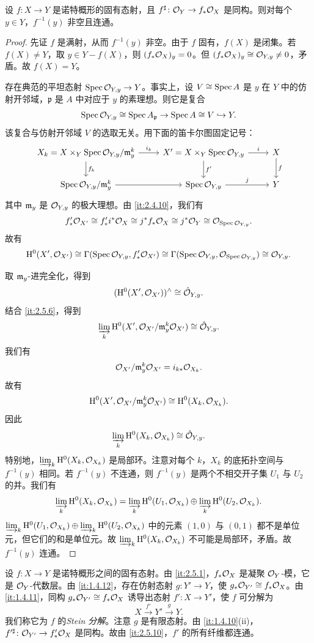 \begin{theorem}[连通性定理]\label{it:2.5.10}
设 $f\colon X\to Y$ 是诺特概形的固有态射，且 $f^\sharp\colon\mathcal{O}_Y\to f_*\mathcal{O}_X$ 是同构。则对每个 $y\in Y$，$f^{-1}(y)$ 非空且连通。
\end{theorem}

\begin{proof}
先证 $f$ 是满射，从而 $f^{-1}(y)$ 非空。由于 $f$ 固有，$f(X)$ 是闭集。若 $f(X)\neq Y$，取 $y\in Y-f(X)$，则 $(f_*\mathcal{O}_X)_y=0$。但 $(f_*\mathcal{O}_X)_y\cong\mathcal{O}_{Y,y}\neq 0$，矛盾。故 $f(X)=Y$。

存在典范的平坦态射 $\operatorname{Spec}\mathcal{O}_{Y,y}\to Y$。事实上，设 $V\cong\operatorname{Spec} A$ 是 $y$ 在 $Y$ 中的仿射开邻域，$\mathfrak{p}$ 是 $A$ 中对应于 $y$ 的素理想。则它是复合
\[
\operatorname{Spec}\mathcal{O}_{Y,y}\cong\operatorname{Spec} A_{\mathfrak{p}}\to\operatorname{Spec} A\cong V\hookrightarrow Y.
\]
该复合与仿射开邻域 $V$ 的选取无关。用下面的笛卡尔图固定记号：
\[
\begin{tikzcd}
X_k=X\times_Y\Spec\cO_{Y,y}/\fm_y^k \arrow[r,"i_k"] \arrow[d,"f_k"] & X'=X\times_Y\Spec\cO_{Y,y} \arrow[r,"i"] \arrow[d,"f'"] & X \arrow[d,"f"] \\
\Spec\cO_{Y,y}/\fm_y^k \arrow[r] & \Spec\cO_{Y,y} \arrow[r,"j"] & Y
\end{tikzcd}
\]
其中 $\mathfrak{m}_y$ 是 $\mathcal{O}_{Y,y}$ 的极大理想。由 \ref{it:2.4.10}，我们有
\[
f'_*\mathcal{O}_{X'}\cong f'_*i^*\mathcal{O}_X\cong j^*f_*\mathcal{O}_X\cong j^*\mathcal{O}_Y\cong\mathcal{O}_{\operatorname{Spec}\mathcal{O}_{Y,y}}.
\]
故有
\[
\mathrm{H}^0(X',\mathcal{O}_{X'})\cong\Gamma(\operatorname{Spec}\mathcal{O}_{Y,y},f'_*\mathcal{O}_{X'})\cong\Gamma(\operatorname{Spec}\mathcal{O}_{Y,y},\mathcal{O}_{\operatorname{Spec}\mathcal{O}_{Y,y}})\cong\mathcal{O}_{Y,y}.
\]

取 $\mathfrak{m}_y$-进完全化，得到
\[
(\mathrm{H}^0(X',\mathcal{O}_{X'}))^{\wedge}\cong\hat{\mathcal{O}}_{Y,y}.
\]
结合 \ref{it:2.5.6}，得到
\[
\varinjlim_k\mathrm{H}^0(X',\mathcal{O}_{X'}/\mathfrak{m}_y^k\mathcal{O}_{X'})\cong\hat{\mathcal{O}}_{Y,y}.
\]
我们有
\[
\mathcal{O}_{X'}/\mathfrak{m}_y^k\mathcal{O}_{X'}=i_{k*}\mathcal{O}_{X_k}.
\]
故有
\[
\mathrm{H}^0(X',\mathcal{O}_{X'}/\mathfrak{m}_y^k\mathcal{O}_{X'})\cong\mathrm{H}^0(X_k,\mathcal{O}_{X_k}).
\]
因此
\[
\varinjlim_k\mathrm{H}^0(X_k,\mathcal{O}_{X_k})\cong\hat{\mathcal{O}}_{Y,y}.
\]
特别地，$\varinjlim_k\mathrm{H}^0(X_k,\mathcal{O}_{X_k})$ 是局部环。注意对每个 $k$，$X_k$ 的底拓扑空间与 $f^{-1}(y)$ 相同。若 $f^{-1}(y)$ 不连通，则 $f^{-1}(y)$ 是两个不相交开子集 $U_1$ 与 $U_2$ 的并。我们有
\[
\varinjlim_k\mathrm{H}^0(X_k,\mathcal{O}_{X_k})=\varinjlim_k\mathrm{H}^0(U_1,\mathcal{O}_{X_k})\oplus\varinjlim_k\mathrm{H}^0(U_2,\mathcal{O}_{X_k}).
\]
$\varinjlim_k\mathrm{H}^0(U_1,\mathcal{O}_{X_k})\oplus\varinjlim_k\mathrm{H}^0(U_2,\mathcal{O}_{X_k})$ 中的元素 $(1,0)$ 与 $(0,1)$ 都不是单位元，但它们的和是单位元。故 $\varinjlim_k\mathrm{H}^0(X_k,\mathcal{O}_{X_k})$ 不可能是局部环，矛盾。故 $f^{-1}(y)$ 连通。
\end{proof}

设 $f\colon X\to Y$ 是诺特概形之间的固有态射。由 \ref{it:2.5.1}，$f_*\mathcal{O}_X$ 是凝聚 $\mathcal{O}_Y$-模，它是 $\mathcal{O}_Y$-代数层。由 \ref{it:1.4.12}，存在仿射态射 $g\colon Y'\to Y$，使 $g_*\mathcal{O}_{Y'}\cong f_*\mathcal{O}_X$。由 \ref{it:1.4.11}，同构 $g_*\mathcal{O}_{Y'}\cong f_*\mathcal{O}_X$ 诱导出态射 $f'\colon X\to Y'$，使 $f$ 可分解为
\[
X\xrightarrow{f'}Y'\xrightarrow{g}Y.
\]
我们称它为 $f$ 的\emph{Stein 分解}。注意 $g$ 是有限态射。由 \ref{it:1.4.10}(ii)，$f'^\sharp\colon\mathcal{O}_{Y'}\to f'_*\mathcal{O}_X$ 是同构。故由 \ref{it:2.5.10}，$f'$ 的所有纤维都连通。

